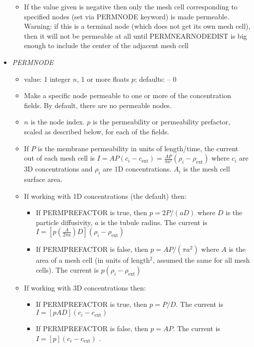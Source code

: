 \documentclass[12pt]{article}
\begin{document}
\begin{itemize}
\begin{itemize}
	\item If the value given is negative then only the mesh cell corresponding to specified nodes (set via PERMNODE keyword) is made permeable. {\color{red} Warning:} if this is a terminal node (which does not get its own mesh cell), then it will not be permeable at all until PERMNEARNODEDIST is big enough to include the center of the adjacent mesh cell
\end{itemize}
%
\item {\it PERMNODE}
\begin{itemize}
	\item  value: 1 integer $n$, 1 or more floats $p$; defaults: -- 0
	\item Make a specific node permeable to one or more of the concentration fields. By default, there are no permeable nodes.	
	\item $n$ is the node index. $p$ is the permeability or permeability prefactor, scaled as described below, for each of the fields.
	\item If $P$ is the membrane permeability in units of length/time, the current out of each mesh cell is $I = AP (c_i - c_\text{ext}) = \frac{AP}{\pi a^2} (\rho_i - \rho_\text{ext})$ where $c_i$ are 3D concentrations and $\rho_i$ are 1D concentrations. $A_i$ is the mesh cell surface area.
	\item If working with 1D concentrations (the default) then:
	\begin{itemize}
	\item If PERMPREFACTOR is true, then $p = 2P/(aD)$ where $D$ is the particle diffusivity, $a$ is the tubule radius. The current is $I = [p (\frac{A}{2\pi a}) D](\rho_i - \rho_\text{ext})$ 
	\item If PERMPREFACTOR is false, then $p = A P/(\pi a^2)$ where $A$ is the area of a mesh cell (in units of length$^2$, assumed the same for all mesh cells). The current is $p(\rho_i - \rho_\text{ext})$
	\end{itemize}
	\item If working with 3D concentrations then:
	\begin{itemize}
		\item If PERMPREFACTOR is true, then $p = P/D$. The current is $I = [p A D](c_i - c_\text{ext})$ 
		\item If PERMPREFACTOR is false, then $p = A P$. The current is $I = [p](c_i - c_\text{ext})$  .		
	\end{itemize}
	
\end{itemize}


\end{itemize}
\end{document}
